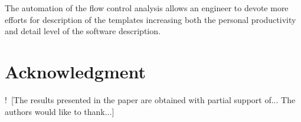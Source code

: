 \documentclass[conference]{IEEEtran}
\newcommand{\nnn}[2][ncolor]{\noindent%
\textcolor{eclr}{!\ [}\textcolor{#1}{#2}\textcolor{eclr}{]}}
\begin{document}
The automation of the flow control analysis allows an engineer to devote more efforts for description of the templates increasing both the personal productivity and detail level of the software description.




\section*{Acknowledgment}

\nnn{The results presented in the paper are obtained with partial support of...
The authors would like to thank...}










%
%
%




\end{document}
